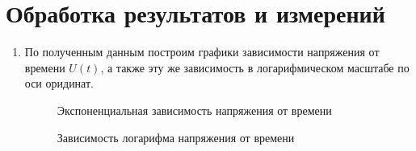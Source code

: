 \documentclass[a4paper,12pt]{article}
\begin{document}
    \section{Обработка результатов и измерений}

    \begin{enumerate}
        \item По полученным данным построим графики зависимости напряжения от времени $U(t)$, а также эту же зависимость в логарифмическом масштабе по оси оридинат.

        \begin{figure}[h!]
            \caption[]{\label{} Экспоненциальная зависимость напряжения от времени}
        \end{figure}
        
        \begin{figure}[h!]
            \caption[]{\label{}Зависимость логарифма напряжения от времени}
        \end{figure}


\end{enumerate}
\end{document}
